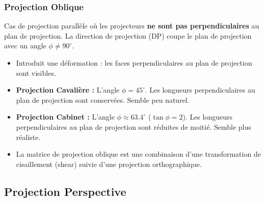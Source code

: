 \documentclass{article}
\begin{document}
\subsubsection{Projection Oblique}
Cas de projection parallèle où les projecteurs \textbf{ne sont pas perpendiculaires} au plan de projection. La direction de projection (DP) coupe le plan de projection avec un angle $\phi \neq 90^\circ$.
\begin{itemize}
    \item Introduit une déformation : les faces perpendiculaires au plan de projection sont visibles.
    \item \textbf{Projection Cavalière :} L'angle $\phi = 45^\circ$. Les longueurs perpendiculaires au plan de projection sont conservées. Semble peu naturel.
    \item \textbf{Projection Cabinet :} L'angle $\phi \approx 63.4^\circ$ ($\tan\phi = 2$). Les longueurs perpendiculaires au plan de projection sont réduites de moitié. Semble plus réaliste.
    \item La matrice de projection oblique est une combinaison d'une transformation de cisaillement (shear) suivie d'une projection orthographique.
\end{itemize}

\subsection{Projection Perspective}
\end{document}
